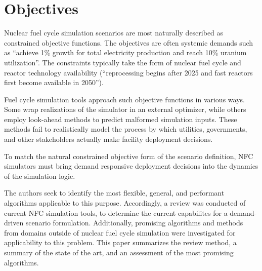 \section{Objectives}
        Nuclear fuel cycle simulation scenarios are most naturally described as 
        constrained objective functions. The objectives are often systemic 
        demands such as ``achieve 1\% growth for total electricity production 
        and reach 10\% uranium utilization''. The constraints typically take 
        the form of nuclear fuel cycle and reactor technology availability 
        (``reprocessing begins after 2025 and fast reactors first become 
        available in 2050'').

        Fuel cycle simulation tools approach such objective functions in 
        various ways.  Some wrap realizations of the simulator in an external 
        optimizer, while others employ look-ahead methods to predict malformed 
        simulation inputs.  These methods fail to realistically model the 
        process by which utilities, governments, and other stakeholders 
        actually make facility deployment decisions.  

        To match the natural constrained objective form of the scenario 
        definition, \gls{NFC} simulators must bring demand responsive 
        deployment decisions into the dynamics of the simulation logic.
        
        The authors seek to identify the most flexible, general, and performant 
        algorithms applicable to this purpose.  Accordingly, a review was 
        conducted of current \gls{NFC} simulation tools, to determine the 
        current capabilites for a demand-driven scenario formulation.  
        Additionally, promising algorithms and methods from domains outside of 
        nuclear fuel cycle simulation were investigated for applicability to 
        this problem. This paper summarizes the review method, a summary of the 
        state of the art, and an assessment of the most promising algorithms.

